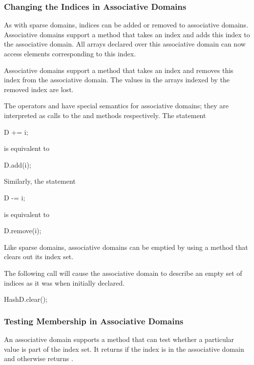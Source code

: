 \subsubsection{Changing the Indices in Associative Domains}

As with sparse domains, indices can be added or removed to associative
domains.  Associative domains support a method  that takes
an index and adds this index to the associative domain.  All arrays
declared over this associative domain can now access elements
corresponding to this index.

Associative domains support a method  that takes an index
and removes this index from the associative domain.  The values in the
arrays indexed by the removed index are lost.

The operators \chpl{+=} and \chpl{-=} have special semantics for
associative domains; they are interpreted as calls to the 
and  methods respectively.  The statement
\begin{chapel}
D += i;
\end{chapel}
is equivalent to
\begin{chapel}
D.add(i);
\end{chapel}
Similarly, the statement
\begin{chapel}
D -= i;
\end{chapel}
is equivalent to
\begin{chapel}
D.remove(i);
\end{chapel}

Like sparse domains, associative domains can be emptied by using a
method  that clears out its index set.

\begin{example}
The following call will cause the associative domain  to
describe an empty set of indices as it was when initially declared.
\begin{chapel}
HashD.clear();
\end{chapel}
\end{example}

\subsubsection{Testing Membership in Associative Domains}

An associative domain supports a  method that can test
whether a particular value is part of the index set. It
returns  if the index is in the associative domain and
otherwise returns .

